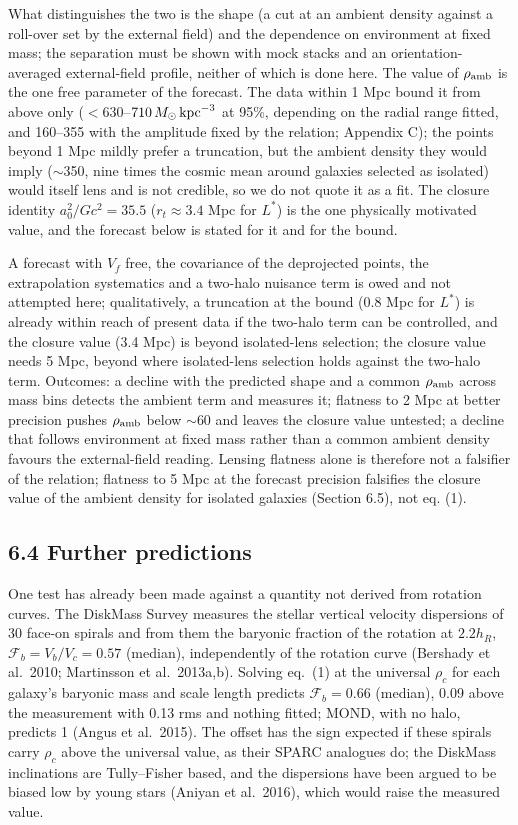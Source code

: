 \documentclass[
  10pt,
]{article}
\begin{document}
What distinguishes the two is the shape (a cut at an ambient density against a roll-over set by the external field) and the dependence on environment at fixed mass; the separation must be shown with mock stacks and an orientation-averaged external-field profile, neither of which is done here. The value of $\rho_{\rm amb}$ is the one free parameter of the forecast. The data within 1 Mpc bound it from above only ($<630$--$710\,M_\odot\,{\rm kpc}^{-3}$ at 95\%, depending on the radial range fitted, and 160--355 with the amplitude fixed by the relation; Appendix C); the points beyond 1 Mpc mildly prefer a truncation, but the ambient density they would imply ($\sim$350, nine times the cosmic mean around galaxies selected as isolated) would itself lens and is not credible, so we do not quote it as a fit. The closure identity $a_0^2/Gc^2=35.5$ ($r_t\approx3.4$ Mpc for $L^*$) is the one physically motivated value, and the forecast below is stated for it and for the bound.

A forecast with $V_f$ free, the covariance of the deprojected points, the extrapolation systematics and a two-halo nuisance term is owed and not attempted here; qualitatively, a truncation at the bound (0.8 Mpc for $L^*$) is already within reach of present data if the two-halo term can be controlled, and the closure value (3.4 Mpc) is beyond isolated-lens selection; the closure value needs 5 Mpc, beyond where isolated-lens selection holds against the two-halo term. Outcomes: a decline with the predicted shape and a common $\rho_{\rm amb}$ across mass bins detects the ambient term and measures it; flatness to 2 Mpc at better precision pushes $\rho_{\rm amb}$ below $\sim$60 and leaves the closure value untested; a decline that follows environment at fixed mass rather than a common ambient density favours the external-field reading. Lensing flatness alone is therefore not a falsifier of the relation; flatness to 5 Mpc at the forecast precision falsifies the closure value of the ambient density for isolated galaxies (Section 6.5), not eq. (1).

\subsection{6.4 Further predictions}

One test has already been made against a quantity not derived from rotation curves. The DiskMass Survey measures the stellar vertical velocity dispersions of 30 face-on spirals and from them the baryonic fraction of the rotation at $2.2h_R$, $\mathcal{F}_b=V_b/V_c=0.57$ (median), independently of the rotation curve (Bershady et al.~2010; Martinsson et al.~2013a,b). Solving eq.~(1) at the universal $\rho_c$ for each galaxy's baryonic mass and scale length predicts $\mathcal{F}_b=0.66$ (median), 0.09 above the measurement with 0.13 rms and nothing fitted; MOND, with no halo, predicts 1 (Angus et al.~2015). The offset has the sign expected if these spirals carry $\rho_c$ above the universal value, as their SPARC analogues do; the DiskMass inclinations are Tully--Fisher based, and the dispersions have been argued to be biased low by young stars (Aniyan et al.~2016), which would raise the measured value.
\end{document}
